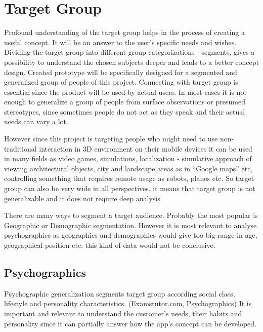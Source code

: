 \section{Target Group}

Profound understanding of the target group helps in the process of creating a useful concept. It will be an answer to the user’s specific needs and wishes. Dividing the target group into different group categorizations - segments, gives a possibility to understand the chosen subjects deeper and leads to a better concept design. Created prototype will be specifically designed for a segmented and generalized group of people of this project. Connecting with target group is essential since the product will be used by actual users. In most cases it is not enough to generalize a group of people from surface observations or presumed stereotypes, since sometimes people do not act as they speak and their actual needs can vary a lot.

However since this project is targeting people who might need to use non-traditional interaction in 3D environment on their mobile devices it can be used in many fields as video games, simulations, localization - simulative approach of viewing architectural objects, city and landscape areas as in “Google maps” etc, controlling something that requires remote usage as robots, planes etc. So target group can also be very wide in all perspectives. it means that target group is not generalizable and it does not require deep analysis. 

There are many ways to segment a target audience. Probably the most popular is Geographic or Demographic segmentation. However it is most relevant to analyse psychographics as geographics and demographics would give too big range in age, geographical position etc. this kind of data would not be conclusive. 

\subsection{Psychographics}
Psychographic generalization segments target group according social class, lifestyle and personality characteristics. (Examstutor.com, Psychographics) It is important and relevant to understand the customer's needs, their habits and personality since it can partially answer how the app's concept can be developed.

